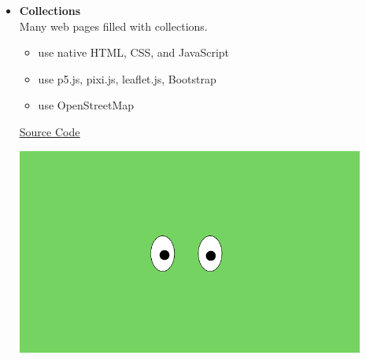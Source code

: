 \documentclass[a4paper,10pt]{article}
\begin{document}
\begin{itemize}[left=0pt, label={}]
    \item
    \begin{minipage}[t]{0.5\textwidth}
        \vspace{0pt}
        \textbf{Collections} \\
        Many web pages filled with collections.
        \vspace{0.5em}
        \begin{itemize}[left=0pt, label={--}, itemsep=0.5em]
            \item use native HTML, CSS, and JavaScript
            \item use p5.js, pixi.js, leaflet.js, Bootstrap
            \item use OpenStreetMap
        \end{itemize}
        \vspace{0.5em}
        \textcolor{customgreen}{\faGithub} \href{https://github.com/qaz5823091/Collections}{\underline{Source Code}}
    \end{minipage}%
    \hfill
    \begin{minipage}[t]{0.45\textwidth}
        \vspace{0pt}
        \centering
        \includegraphics[width=0.9\textwidth]{images/collections.png}
    \end{minipage}
    \vspace{2em}
\end{itemize}
\end{document}
